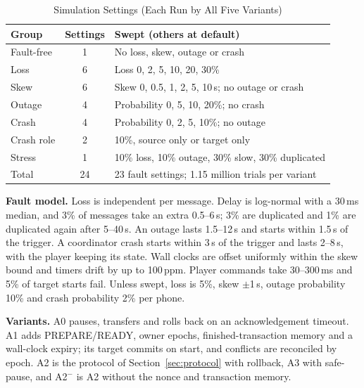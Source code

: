 \documentclass[conference]{IEEEtran}
\begin{document}
\begin{table}[t]
\caption{Simulation Settings (Each Run by All Five Variants)}
\label{tab:runs}
\centering
\footnotesize
\begin{tabularx}{\columnwidth}{@{}lcY@{}}
\toprule
\textbf{Group} & \textbf{Settings} & \textbf{Swept (others at default)} \\
\midrule
Fault-free & 1 & No loss, skew, outage or crash \\
Loss & 6 & Loss 0, 2, 5, 10, 20, 30\% \\
Skew & 6 & Skew 0, 0.5, 1, 2, 5, 10\,s; no outage or crash \\
Outage & 4 & Probability 0, 5, 10, 20\%; no crash \\
Crash & 4 & Probability 0, 2, 5, 10\%; no outage \\
Crash role & 2 & 10\%, source only or target only \\
Stress & 1 & 10\% loss, 10\% outage, 30\% slow, 30\% duplicated \\
\midrule
Total & 24 & 23 fault settings; 1.15 million trials per variant \\
\bottomrule
\end{tabularx}
\end{table}

\textbf{Fault model.} Loss is independent per message. Delay is log-normal with a 30\,ms median, and 3\% of messages take an extra 0.5--6\,s; 3\% are duplicated and 1\% are duplicated again after 5--40\,s. An outage lasts 1.5--12\,s and starts within 1.5\,s of the trigger. A coordinator crash starts within 3\,s of the trigger and lasts 2--8\,s, with the player keeping its state. Wall clocks are offset uniformly within the skew bound and timers drift by up to 100\,ppm. Player commands take 30--300\,ms and 5\% of target starts fail. Unless swept, loss is 5\%, skew $\pm$1\,s, outage probability 10\% and crash probability 2\% per phone.

\textbf{Variants.} A0 pauses, transfers and rolls back on an acknowledgement timeout. A1 adds PREPARE/READY, owner epochs, finished-transaction memory and a wall-clock expiry; its target commits on start, and conflicts are reconciled by epoch. A2 is the protocol of Section~\ref{sec:protocol} with rollback, A3 with safe-pause, and A2$^-$ is A2 without the nonce and transaction memory.
\end{document}
